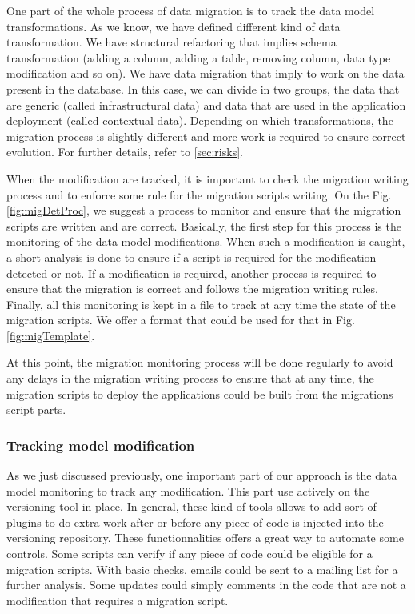 One part of the whole process of data migration is to track the data model transformations. As we know, we have defined different kind of data transformation. We have structural refactoring that implies schema transformation (adding a column, adding a table, removing column, data type modification and so on). We have data migration that imply to work on the data present in the database. In this case, we can divide in two groups, the data that are generic (called infrastructural data) and data that are used in the application deployment (called contextual data). Depending on which transformations, the migration process is slightly different and more work is required to ensure correct evolution. For further details, refer to \autoref{sec:risks}.

When the modification are tracked, it is important to check the migration writing process and to enforce some rule for the migration scripts writing. On the Fig. \ref{fig:migDetProc}, we suggest a process to monitor and ensure that the migration scripts are written and are correct. Basically, the first step for this process is the monitoring of the data model modifications. When such a modification is caught, a short analysis is done to ensure if a script is required for the modification detected or not. If a modification is required, another process is required to ensure that the migration is correct and follows the migration writing rules. Finally, all this monitoring is kept in a file to track at any time the state of the migration scripts. We offer a format that could be used for that in Fig. \ref{fig:migTemplate}.

At this point, the migration monitoring process will be done regularly to avoid any delays in the migration writing process to ensure that at any time, the migration scripts to deploy the applications could be built from the migrations script parts.

\subsubsection{Tracking model modification\\}

As we just discussed previously, one important part of our approach is the data model monitoring to track any modification. This part use actively on the versioning tool in place. In general, these kind of tools allows to add sort of plugins to do extra work after or before any piece of code is injected into the versioning repository. These functionnalities offers a great way to automate some controls. Some scripts can verify if any piece of code could be eligible for a migration scripts. With basic checks, emails could be sent to a mailing list for a further analysis. Some updates could simply comments in the code that are not a modification that requires a migration script.

